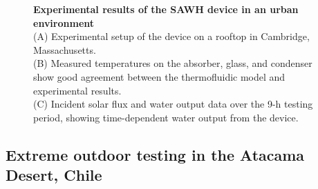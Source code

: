 \documentclass[11pt]{article}
\begin{document}
\begin{figure}[t]
\centering
{}
\caption{\textbf{Experimental results of the SAWH device in an urban environment} \\
(A) Experimental setup of the device on a rooftop in Cambridge, Massachusetts. \\
(B) Measured temperatures on the absorber, glass, and condenser show good agreement between the thermofluidic model and experimental results. \\
(C) Incident solar flux and water output data over the 9-h testing period, showing time-dependent water output from the device.}
\label{fig:fig3}
\end{figure}

\subsection{Extreme outdoor testing in the Atacama Desert, Chile}
\end{document}
